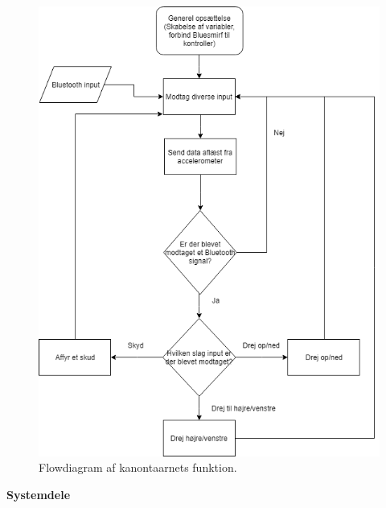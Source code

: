 \begin{figure}[H]
\centering
\includegraphics[scale=0.8]{Billeder/Flowchart1.png}
\caption{Flowdiagram af kanontaarnets funktion.}
\label{fig:Flowdiagram1}
\end{figure}

\newpage
\textbf{Systemdele}

